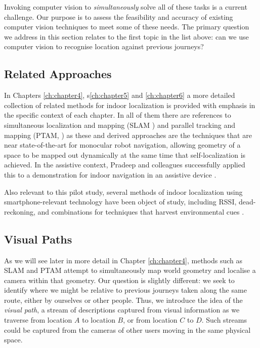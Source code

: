 Invoking computer vision to \textit{simultaneously} solve all of these tasks is a current challenge.  Our purpose is to assess the feasibility and accuracy of existing computer vision techniques to meet some of these needs.  The primary question we address in this section relates to the first topic in the list above: can we use computer vision to recognise location against previous journeys?

\subsection{Related Approaches}
 
In Chapters \ref{ch:chapter4}, s\ref{ch:chapter5} and \ref{ch:chapter6} a more detailed collection of related methods for indoor localization is provided with emphasis in the specific context of each chapter. In all of them there are references to simultaneous localization and mapping (SLAM \cite{Durrant-Whyte2006}) and parallel tracking and mapping (PTAM, \cite{Klein2009}) as these and derived approaches are the techniques that  are near state-of-the-art for monocular robot navigation, allowing geometry of a space to be mapped out dynamically at the same time that self-localization is achieved.  In the assistive context, Pradeep and colleagues successfully applied this to a demonstration for indoor navigation in an assistive device \cite{Pradeep2010}.

Also relevant to this pilot study, several methods of indoor localization using smartphone-relevant technology have been object of study, including RSSI, dead-reckoning, and combinations for techniques that harvest environmental cues \cite{Wang2012,Shen}. 
 

\subsection{Visual Paths} 

 As we will see later in more detail in Chapter \ref{ch:chapter4}, methods such as SLAM and PTAM attempt to simultaneously map world geometry and localise a camera within that geometry.  Our question is slightly different: we seek to identify where we might be relative to previous journeys taken along the same route, either by ourselves or other people.  Thus, we introduce the idea of the \textit{visual path}, a stream of descriptions captured from visual information as we traverse from location $A$ to location $B$, or from location $C$ to $D$. Such streams could be captured from the cameras of other users moving in the same physical space.

